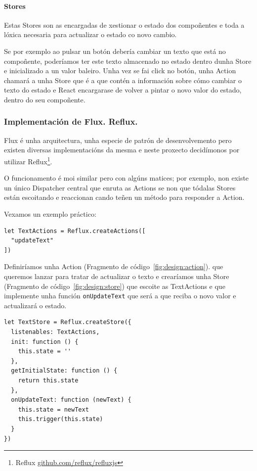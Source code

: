         \paragraph{Stores}
        Estas Stores son as encargadas de xestionar o estado dos compoñentes e 
toda a lóxica necesaria para actualizar o estado co novo cambio.

        Se por exemplo ao pulsar un botón debería cambiar un texto que está no 
compoñente, poderíamos ter este texto almacenado no estado dentro dunha Store e 
inicializado a un valor baleiro.
        Unha vez se fai click no botón, unha Action chamará a unha Store que é 
a que contén a información sobre cómo cambiar o texto do estado e React 
encargarase de volver a pintar o novo valor do estado, dentro do seu compoñente.

      \subsubsection{Implementación de Flux. Reflux.}
      Flux é unha arquitectura, unha especie de patrón de desenvolvemento pero 
existen diversas implementacións da mesma e neste proxecto decidímonos por 
utilizar Reflux\footnote{Reflux 
\href{https://github.com/reflux/refluxjs}{github.com/reflux/refluxjs}}.

      O funcionamento é moi similar pero con algúns matices; por exemplo,
non existe un único Dispatcher central que enruta as Actions se non que 
tódalas Stores están escoitando e reaccionan cando teñen un método para 
responder a Action.

     Vexamos un exemplo práctico:

    \lstset{}
     \begin{lstlisting}[caption=Exemplo de Action., label=fig:design:action]
let TextActions = Reflux.createActions([
  "updateText"
])
    \end{lstlisting}

    Definiríamos unha Action (Fragmento de código~\ref{fig:design:action}). que 
queremos lanzar para tratar de actualizar o texto e crearíamos unha Store 
(Fragmento de código~\ref{fig:design:store}) que escoite as TextActions e que 
implemente unha función \lstinline{onUpdateText} que será a que reciba o novo 
valor e 
actualizará o estado.

    \lstset{}
     \begin{lstlisting}[caption=Exemplo de Store., label=fig:design:store]
let TextStore = Reflux.createStore({
  listenables: TextActions,
  init: function () {
    this.state = ''
  },
  getInitialState: function () {
    return this.state
  },
  onUpdateText: function (newText) {
    this.state = newText
    this.trigger(this.state)
  }
})
    \end{lstlisting}

